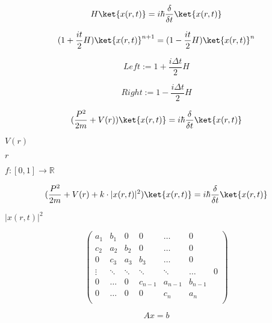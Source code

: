 \documentclass{article}
\begin{document}
\[ \]
\pagebreak

\[ H\ket{x(r, t)} = i\hbar \frac{\delta}{\delta t}\ket{x(r,t)} \]
\pagebreak

\[ (1 + \frac{it}{2} H)\ket{x(r,t)}^{n+1} = (1 - \frac{it}{2} H)\ket{x(r,t)}^{n} \]
\pagebreak

\[ Left := 1 + \frac{i\Delta t}{2} H \]
\pagebreak

\[ Right := 1 - \frac{i\Delta t}{2} H \]
\pagebreak

\[ (\frac{P^2}{2m} + V(r))\ket{x(r, t)} = i\hbar \frac{\delta}{\delta t}\ket{x(r,t)} \]
\pagebreak

$V(r)$
\pagebreak

$r$
\pagebreak

$ f:[0,1]\rightarrow\mathbb{R} $
\pagebreak

\[ (\frac{P^2}{2m} + V(r) + k\cdot|x(r,t)|^2)\ket{x(r, t)} = i\hbar \frac{\delta}{\delta t}\ket{x(r,t)} \]
\pagebreak

$ |x(r,t)|^2 $
\pagebreak

\[ \begin{pmatrix} a_1 & b_1 & 0 & 0 & \dots & 0 \\ c_2 & a_2 & b_2 & 0 & \dots & 0 \\ 0 & c_3 & a_3 & b_3 & \dots & 0 \\ \vdots & \ddots & \ddots & \ddots & \ddots & \dots & 0 \\ 0 & \dots & 0 & c_{n-1} & a_{n - 1} & b_{n-1} \\ 0 & \dots & 0 & 0 & c_n & a_n \\ \end{pmatrix} \]
\pagebreak

\[ Ax = b \]
\pagebreak
\end{document}
